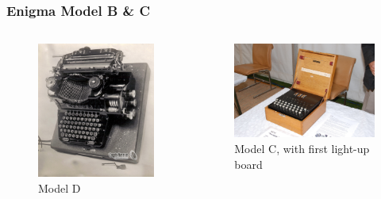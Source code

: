 \documentclass{beamer}
\newcommand{\<}{\langle}
\renewcommand{\>}{\rangle}
\begin{document}
\begin{frame}
\frametitle{Enigma Model B \& C}
\begin{columns}
\begin{column}{.5\textwidth}
\begin{figure}
\includegraphics[scale=.1]{IMG/modelB.jpg}
\caption{\scriptsize Model D}
\end{figure}
\end{column}

\begin{column}{.5\textwidth}
\begin{figure}
\includegraphics[scale=.5]{IMG/modelC.jpg}
\caption{\scriptsize Model C, with first light-up board}
\end{figure}
\end{column}
\end{columns}
\end{frame}
\end{document}
